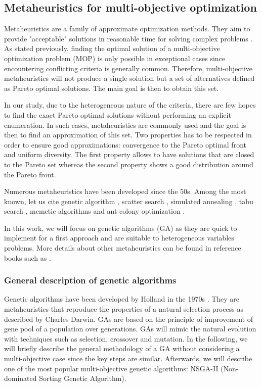 \subsection{Metaheuristics for multi-objective optimization}
\label{subsec:metaheuristics}
Metaheuristics are a family of approximate optimization methods. They aim to provide "acceptable" solutions in reasonable time for solving complex problems \cite{talbi09}. As stated previously, finding the optimal solution of a multi-objective optimization problem (MOP) is only possible in exceptional cases since encountering conflicting criteria is generally common. Therefore, multi-objective metaheuristics will not produce a single solution but a set of alternatives defined as Pareto optimal solutions. The main goal is then to obtain this set.

In our study, due to the heterogeneous nature of the criteria, there are few hopes to find the exact Pareto optimal solutions without performing an explicit enumeration. In such cases, metaheuristics are commonly used and the goal is then to find an approximation of this set. Two properties has to be respected in order to ensure good approximations: convergence to the Pareto optimal front and uniform diversity. The first property allows to have solutions that are closed to the Pareto set whereas the second property shows a good distribution around the Pareto front.

Numerous metaheuristics have been developed since the 50s. Among the most known, let us cite genetic algorithm \cite{holland1975adaptation}, scatter search \cite{Glover77}, simulated annealing \cite{KirkpatrickGelattVecchi83}, tabu search \cite{Glover86}, memetic algorithms \cite{moscato89on} and ant colony optimization \cite{Dor92a.phd}.

In this work, we will focus on genetic algorithms (GA) as they are quick to implement for a first approach and are suitable to heterogeneous variables problems. More details about other metaheuristics can be found in reference books such as \cite{talbi09,dreo06metaheuristics,8125462}.

\subsubsection{General description of genetic algorithms}
Genetic algorithms have been developed by Holland in the 1970s \cite{holland1975adaptation}. They are metaheuristics that reproduce the properties of a natural selection process as described by Charles Darwin. GAs are based on the principle of improvement of gene pool of a population over generations. GAs will mimic the natural evolution with techniques such as selection, crossover and mutation. In the following, we will briefly describe the general methodology of a GA without considering a multi-objective case since the key steps are similar. Afterwards, we will describe one of the most popular multi-objective genetic algorithms: NSGA-II (Non-dominated Sorting Genetic Algorithm).

